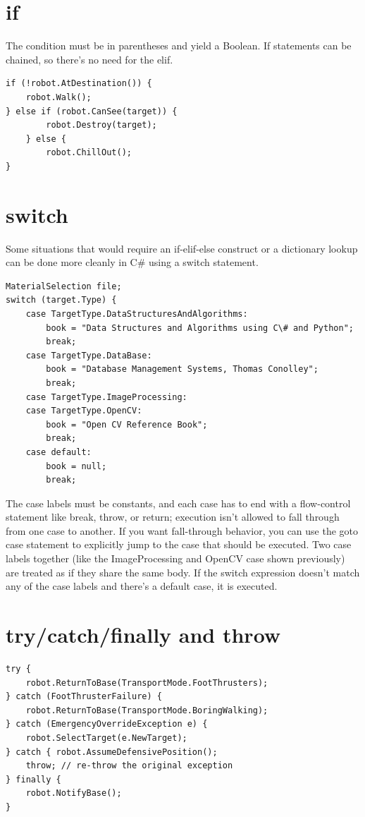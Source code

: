 \documentclass[12pt,a4paper,final,twoside,titlepage]{book}
\begin{document}
\section{if}
The condition must be in parentheses and yield a Boolean. If statements can be chained, so there’s no need for the elif.
\begin{lstlisting}
if (!robot.AtDestination()) { 
	robot.Walk();
} else if (robot.CanSee(target)) { 
		robot.Destroy(target);
	} else { 
		robot.ChillOut();
}
\end{lstlisting}
\section{switch}
Some situations that would require an if-elif-else construct or a dictionary lookup can be done more cleanly in C\# using a switch statement.
\begin{lstlisting}
MaterialSelection file; 
switch (target.Type) {
	case TargetType.DataStructuresAndAlgorithms: 
		book = "Data Structures and Algorithms using C\# and Python"; 
		break;
	case TargetType.DataBase: 
		book = "Database Management Systems, Thomas Conolley"; 
		break;
	case TargetType.ImageProcessing: 
	case TargetType.OpenCV:
		book = "Open CV Reference Book";
		break; 
	case default:
		book = null; 
		break;
\end{lstlisting}
The case labels must be constants, and each case has to end with a flow-control statement like break, throw, or return; execution isn’t allowed to fall through from one case to another. If you want fall-through behavior, you can use the goto case statement to explicitly jump to the case that should be executed. Two case labels together (like the ImageProcessing and OpenCV case shown previously) are treated as if they share the same body. If the switch expression doesn’t match any of the case labels and there’s a default case, it is executed.
\section{try/catch/finally and throw}
\begin{lstlisting}
try { 
	robot.ReturnToBase(TransportMode.FootThrusters);
} catch (FootThrusterFailure) { 
	robot.ReturnToBase(TransportMode.BoringWalking);
} catch (EmergencyOverrideException e) { 
	robot.SelectTarget(e.NewTarget);
} catch { robot.AssumeDefensivePosition(); 
	throw; // re-throw the original exception
} finally { 
	robot.NotifyBase();
}
\end{lstlisting}
\end{document}
